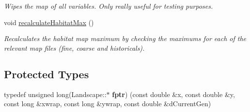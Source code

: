 \begin{DoxyCompactItemize}
\begin{DoxyCompactList}\small\item\em Wipes the map of all variables. Only really useful for testing purposes. \end{DoxyCompactList}\item 
void \hyperlink{class_landscape_abaf14ac4da88cd26f6593bdaa88d999f}{recalculate\+Habitat\+Max} ()\hypertarget{class_landscape_abaf14ac4da88cd26f6593bdaa88d999f}{}\label{class_landscape_abaf14ac4da88cd26f6593bdaa88d999f}

\begin{DoxyCompactList}\small\item\em Recalculates the habitat map maximum by checking the maximums for each of the relevant map files (fine, coarse and historicals). \end{DoxyCompactList}\end{DoxyCompactItemize}
\subsection*{Protected Types}
\begin{DoxyCompactItemize}
\item 
typedef unsigned long(Landscape\+::$\ast$ {\bfseries fptr}) (const double \&x, const double \&y, const long \&xwrap, const long \&ywrap, const double \&d\+Current\+Gen)\hypertarget{class_landscape_a0458438a91632e19343e3cf8c2d994f1}{}\label{class_landscape_a0458438a91632e19343e3cf8c2d994f1}

\end{DoxyCompactItemize}
